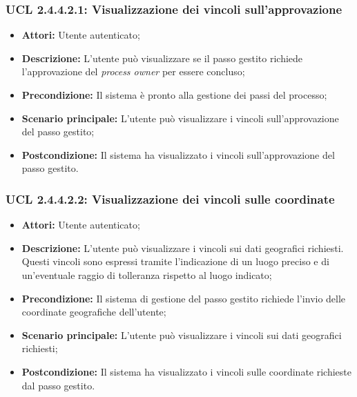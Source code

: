 \hypertarget{L2.4.4.2.1}{}
\subsubsection{UCL 2.4.4.2.1: Visualizzazione dei vincoli sull'approvazione}
\begin{itemize}
\item \textbf{Attori:} Utente autenticato;
\item \textbf{Descrizione:} L'utente può visualizzare se il passo gestito richiede l'approvazione del \textit{process owner} per essere concluso;
\item \textbf{Precondizione:} Il sistema è pronto alla gestione dei passi del processo;
\item \textbf{Scenario principale:} L'utente può visualizzare i vincoli sull'approvazione del passo gestito;
\item \textbf{Postcondizione:} Il sistema ha visualizzato i vincoli sull'approvazione del passo gestito.
\end{itemize}

\hypertarget{L2.4.4.2.2}{}
\subsubsection{UCL 2.4.4.2.2: Visualizzazione dei vincoli sulle coordinate}
\begin{itemize}
\item \textbf{Attori:} Utente autenticato;
\item \textbf{Descrizione:} L'utente può visualizzare i vincoli sui dati geografici richiesti. Questi vincoli sono espressi tramite l'indicazione di un luogo preciso e di un'eventuale raggio di tolleranza rispetto al luogo indicato;
\item \textbf{Precondizione:} Il sistema di gestione del passo gestito richiede l'invio delle coordinate geografiche dell'utente;
\item \textbf{Scenario principale:} L'utente può visualizzare i vincoli sui dati geografici richiesti;
\item \textbf{Postcondizione:} Il sistema ha visualizzato i vincoli sulle coordinate richieste dal passo gestito.
\end{itemize}

